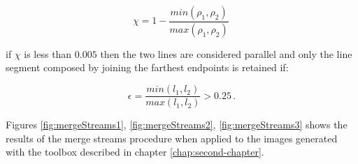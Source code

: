 \begin{equation}
\chi = 1 - \frac{min(\rho_1,\rho_2)}{max(\rho_1,\rho_2)} \,
\end{equation}

if $\chi$ is less than $0.005$ then the two lines are considered parallel and only the line segment composed by joining the farthest endpoints is retained if:

\begin{equation}
\epsilon = \frac{min(l_1,l_2)}{max(l_1,l_2)} > 0.25 \,.
\end{equation}

Figures \ref{fig:mergeStreams1}, \ref{fig:mergeStreams2}, \ref{fig:mergeStreams3} shows the results of the merge streams procedure when applied to the images generated with the toolbox described in chapter \ref{chap:second-chapter}. 


